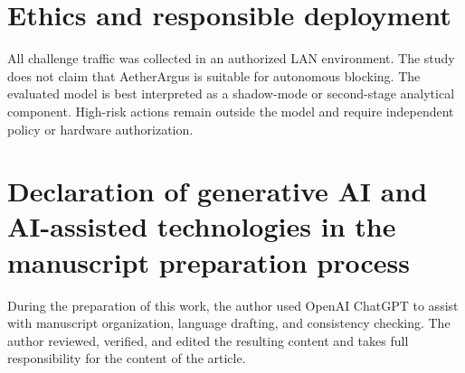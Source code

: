 \documentclass[preprint,12pt,authoryear]{elsarticle}
\newcommand{\model}{AetherArgus}
\begin{document}
\section*{Ethics and responsible deployment}
All challenge traffic was collected in an authorized LAN environment. The study does not claim that \model{} is suitable for autonomous blocking. The evaluated model is best interpreted as a shadow-mode or second-stage analytical component. High-risk actions remain outside the model and require independent policy or hardware authorization.

\section*{Declaration of generative AI and AI-assisted technologies in the manuscript preparation process}
During the preparation of this work, the author used OpenAI ChatGPT to assist with manuscript organization, language drafting, and consistency checking. The author reviewed, verified, and edited the resulting content and takes full responsibility for the content of the article.



\end{document}
